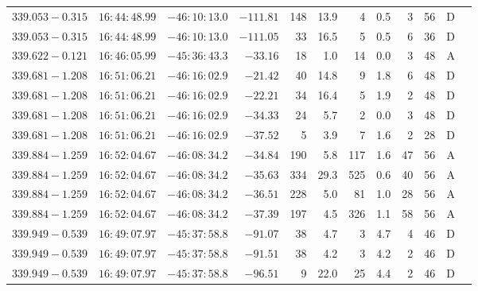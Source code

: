 {\begin{longtable}{c rrr rrrrr rr c}
    $339.053-0.315$     &   $16:44:48.99$     &   $-46:10:13.0$     &   $-111.81 $    &   148    &   13.9    &    4   &   0.5 &   3   &   56  &   D   \\
    $339.053-0.315$     &   $16:44:48.99$     &   $-46:10:13.0$     &   $-111.05 $    &   33     &   16.5    &    5   &   0.5 &   6   &   36  &   D   \\
    $339.622-0.121$     &   $16:46:05.99$     &   $-45:36:43.3$     &   $-33.16  $    &   18     &    1.0    &    14  &   0.0 &   3   &   48  &   A   \\
    $339.681-1.208$     &   $16:51:06.21$     &   $-46:16:02.9$     &   $-21.42  $    &   40     &   14.8    &    9   &   1.8 &   6   &   48  &   D   \\
    $339.681-1.208$     &   $16:51:06.21$     &   $-46:16:02.9$     &   $-22.21  $    &   34     &   16.4    &    5   &   1.9 &   2   &   48  &   D   \\
    $339.681-1.208$     &   $16:51:06.21$     &   $-46:16:02.9$     &   $-34.33  $    &   24     &    5.7    &    2   &   0.0 &   3   &   48  &   D   \\
    $339.681-1.208$     &   $16:51:06.21$     &   $-46:16:02.9$     &   $-37.52  $    &   5      &    3.9    &    7   &   1.6 &   2   &   28  &   D   \\
    $339.884-1.259$     &   $16:52:04.67$     &   $-46:08:34.2$     &   $-34.84  $    &   190    &    5.8    &    117 &   1.6 &   47  &   56  &   A   \\
    $339.884-1.259$     &   $16:52:04.67$     &   $-46:08:34.2$     &   $-35.63  $    &   334    &   29.3    &    525 &   0.6 &   40  &   56  &   A   \\
    $339.884-1.259$     &   $16:52:04.67$     &   $-46:08:34.2$     &   $-36.51  $    &   228    &    5.0    &    81  &   1.0 &   28  &   56  &   A   \\
    $339.884-1.259$     &   $16:52:04.67$     &   $-46:08:34.2$     &   $-37.39  $    &   197    &    4.5    &    326 &   1.1 &   58  &   56  &   A   \\
    $339.949-0.539$     &   $16:49:07.97$     &   $-45:37:58.8$     &   $-91.07  $    &   38     &    4.7    &    3   &   4.7 &   4   &   46  &   D   \\
    $339.949-0.539$     &   $16:49:07.97$     &   $-45:37:58.8$     &   $-91.51  $    &   38     &    4.2    &    3   &   4.2 &   2   &   46  &   D   \\
    $339.949-0.539$     &   $16:49:07.97$     &   $-45:37:58.8$     &   $-96.51  $    &   9      &   22.0    &    25  &   4.4 &   2   &   46  &   D   \\

\end{longtable}}
